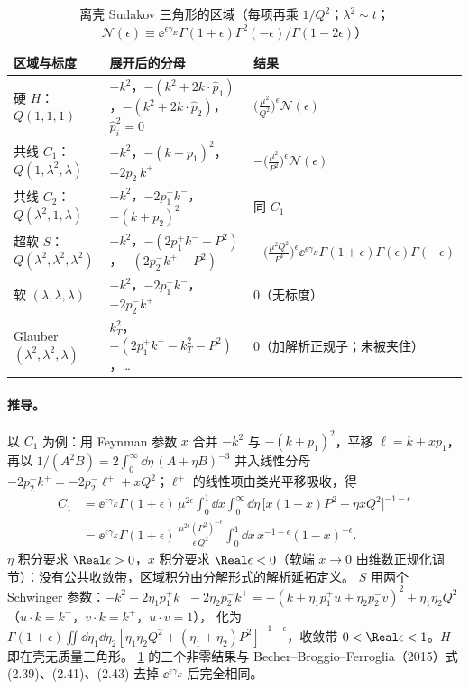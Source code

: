 \begin{table}[htbp]\centering\footnotesize
\caption{离壳 Sudakov 三角形的区域（每项再乘 $1/Q^2$；$\lambda^2\sim t$；$\mathcal N(\epsilon)\equiv\ee^{\epsilon\gamma_E}\Gamma(1+\epsilon)\Gamma^2(-\epsilon)/\Gamma(1-2\epsilon)$）}\label{tab:reg-offshell}
\renewcommand{\arraystretch}{1.35}
\begin{tabularx}{\textwidth}{@{}>{\raggedright\arraybackslash}p{3.0cm}>{\raggedright\arraybackslash}X>{\raggedright\arraybackslash}p{4.6cm}@{}}\toprule
区域与标度 & 展开后的分母 & 结果\\\midrule
硬 $H$：$Q(1,1,1)$ & $-k^2$，$-(k^2+2k\cdot\hat p_1)$，$-(k^2+2k\cdot\hat p_2)$，$\hat p_i^2=0$ &
$\big(\tfrac{\mu^2}{Q^2}\big)^{\epsilon}\mathcal N(\epsilon)$\\
共线 $C_1$：$Q(1,\lambda^2,\lambda)$ & $-k^2$，$-(k+p_1)^2$，$-2p_2^-k^+$ &
$-\big(\tfrac{\mu^2}{P^2}\big)^{\epsilon}\mathcal N(\epsilon)$\\
共线 $C_2$：$Q(\lambda^2,1,\lambda)$ & $-k^2$，$-2p_1^+k^-$，$-(k+p_2)^2$ & 同 $C_1$\\
超软 $S$：$Q(\lambda^2,\lambda^2,\lambda^2)$ & $-k^2$，$-(2p_1^+k^--P^2)$，$-(2p_2^-k^+-P^2)$ &
$-\big(\tfrac{\mu^2Q^2}{P^4}\big)^{\epsilon}\ee^{\epsilon\gamma_E}\Gamma(1+\epsilon)\Gamma(\epsilon)\Gamma(-\epsilon)$\\
软 $(\lambda,\lambda,\lambda)$ & $-k^2$，$-2p_1^+k^-$，$-2p_2^-k^+$ & $0$（无标度）\\
Glauber $(\lambda^2,\lambda^2,\lambda)$ & $k_T^2$，$-(2p_1^+k^--k_T^2-P^2)$，… & $0$（加解析正规子；未被夹住）\\\bottomrule
\end{tabularx}
\end{table}

\paragraph{推导。}以 $C_1$ 为例：用 Feynman 参数 $x$ 合并 $-k^2$ 与 $-(k+p_1)^2$，平移 $\ell=k+xp_1$，再以
$1/(A^2B)=2\int_0^\infty\dd\eta\,(A+\eta B)^{-3}$ 并入线性分母 $-2p_2^-k^+=-2p_2^-\ell^++xQ^2$；$\ell^+$ 的线性项由类光平移吸收，得
\begin{align*}
C_1&=\ee^{\epsilon\gamma_E}\Gamma(1+\epsilon)\,\mu^{2\epsilon}\int_0^1\!\dd x\int_0^\infty\!\dd\eta\,\big[x(1-x)P^2+\eta xQ^2\big]^{-1-\epsilon}\\
&=\ee^{\epsilon\gamma_E}\Gamma(1+\epsilon)\,\frac{\mu^{2\epsilon}(P^2)^{-\epsilon}}{\epsilon\,Q^2}\int_0^1\dd x\,x^{-1-\epsilon}(1-x)^{-\epsilon}.
\end{align*}
$\eta$ 积分要求 $\Real\epsilon>0$，$x$ 积分要求 $\Real\epsilon<0$（软端 $x\to0$ 由维数正规化调节）：没有公共收敛带，区域积分由分解形式的解析延拓定义。
$S$ 用两个 Schwinger 参数：$-k^2-2\eta_1p_1^+k^--2\eta_2p_2^-k^+=-(k+\eta_1p_1^+u+\eta_2p_2^-v)^2+\eta_1\eta_2Q^2$（$u\cdot k=k^-$，$v\cdot k=k^+$，$u\cdot v=1$），
化为 $\Gamma(1+\epsilon)\iint\dd\eta_1\dd\eta_2[\eta_1\eta_2Q^2+(\eta_1+\eta_2)P^2]^{-1-\epsilon}$，收敛带 $0<\Real\epsilon<1$。$H$ 即在壳无质量三角形。
\cref{tab:reg-offshell} 的三个非零结果与 Becher--Broggio--Ferroglia（2015）式 (2.39)、(2.41)、(2.43) 去掉 $\ee^{\epsilon\gamma_E}$ 后完全相同。

